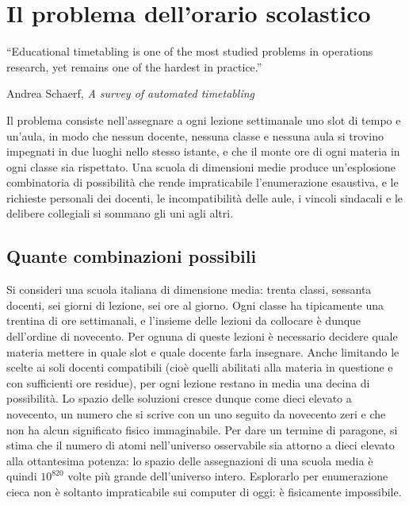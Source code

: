 \chapter{Il problema dell'orario scolastico}
\label{ch:problema_timetabling}

\epigraph{``Educational timetabling is one of the most studied
problems in operations research, yet remains one of the
hardest in practice.''}{Andrea Schaerf,
\emph{A survey of automated timetabling}~\parencite{schaerf1999}}

Il problema consiste nell'assegnare a ogni lezione settimanale
uno slot di tempo e un'aula, in modo che nessun docente,
nessuna classe e nessuna aula si trovino impegnati in due
luoghi nello stesso istante, e che il monte ore di ogni
materia in ogni classe sia rispettato. Una scuola di
dimensioni medie produce un'esplosione combinatoria di
possibilit\`a che rende impraticabile l'enumerazione
esaustiva, e le richieste personali dei docenti, le
incompatibilit\`a delle aule, i vincoli sindacali e le
delibere collegiali si sommano gli uni agli altri.

\section{Quante combinazioni possibili}

Si consideri una scuola italiana di dimensione media: trenta
classi, sessanta docenti, sei giorni di lezione, sei ore al
giorno. Ogni classe ha tipicamente una trentina di ore
settimanali, e l'insieme delle lezioni da collocare \`e
dunque dell'ordine di novecento. Per ognuna di queste lezioni
\`e necessario decidere quale materia mettere in quale slot e
quale docente farla insegnare. Anche limitando le scelte ai
soli docenti compatibili (cio\`e quelli abilitati alla materia
in questione e con sufficienti ore residue), per ogni lezione
restano in media una decina di possibilit\`a. Lo spazio delle
soluzioni cresce dunque come dieci elevato a novecento, un
numero che si scrive con un uno seguito da novecento zeri e
che non ha alcun significato fisico immaginabile. Per dare
un termine di paragone, si stima che il numero di atomi
nell'universo osservabile sia attorno a dieci elevato alla
ottantesima potenza: lo spazio delle assegnazioni di una
scuola media \`e quindi $10^{820}$ volte pi\`u grande
dell'universo intero. Esplorarlo per enumerazione cieca non
\`e soltanto impraticabile sui computer di oggi: \`e
fisicamente impossibile.


